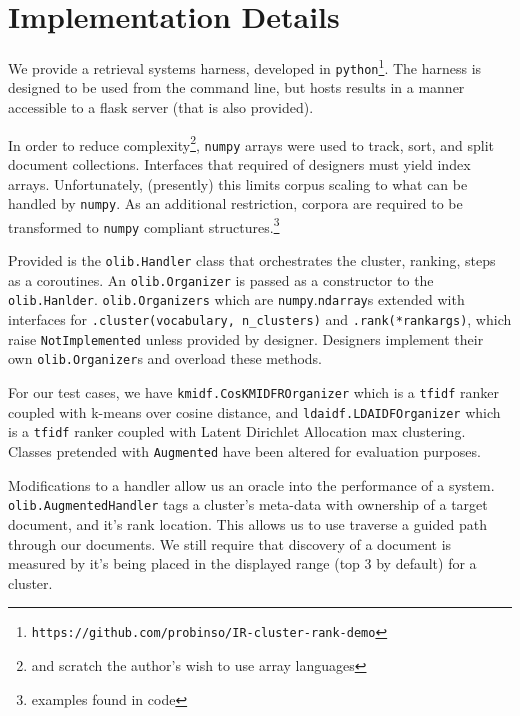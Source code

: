 \documentclass[11pt]{article}
\def\site{\texttt{https://github.com/probinso/IR-cluster-rank-demo}\xspace}
\def\tfidf{\texttt{tfidf}\xspace}
\def\python{\texttt{python}\xspace}
\def\np{\texttt{numpy}\xspace}
\begin{document}
\section{Implementation Details}
We provide a retrieval systems harness, developed in \python\footnote{\site}. The
harness is designed to be used from the command line, but hosts results in a manner
accessible to a flask server (that is also provided).

In order to reduce complexity\footnote{and scratch the author's wish to use array languages},
\np arrays were used to track, sort, and split document collections. Interfaces that
required of designers must yield index arrays. Unfortunately, (presently) this limits
corpus scaling to what can be handled by \np. As an additional restriction, corpora are
required to be transformed to \np compliant structures.\footnote{examples found in code}

Provided is the \texttt{olib.Handler} class that orchestrates the cluster, ranking,
steps as a coroutines. An \texttt{olib.Organizer} is passed as a constructor to the
\texttt{olib.Hanlder}.
\texttt{olib.Organizers} which are \np.\texttt{ndarray}s extended with interfaces for
\texttt{.cluster(vocabulary, n\_clusters)} and \texttt{.rank(*rankargs)}, which raise
\texttt{NotImplemented} unless provided by designer. Designers implement their own
\texttt{olib.Organizer}s and overload these methods.

For our test cases, we have \texttt{kmidf.CosKMIDFROrganizer} which is a \tfidf
ranker coupled with k-means over cosine distance, and \texttt{ldaidf.LDAIDFOrganizer}
which is a \tfidf ranker coupled with Latent Dirichlet Allocation max clustering.
Classes pretended with \texttt{Augmented} have been altered for evaluation purposes.

Modifications to a handler allow us an oracle into the performance of a system.
\texttt{olib.AugmentedHandler} tags a cluster's meta-data with ownership of a target
document, and it's rank location. This allows us to use traverse a guided path
through our documents. We still require that discovery of a document is measured by
it's being placed in the displayed range (top 3 by default) for a cluster.

\end{document}
